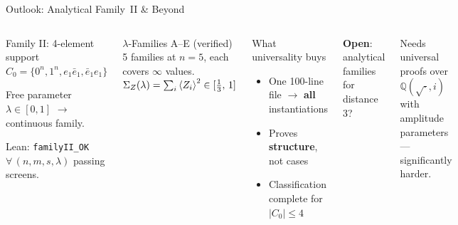 \documentclass[aspectratio=169,t]{beamer}
\newcommand{\QQ}{\mathbb{Q}}
\newcommand{\code}[1]{\texttt{\small #1}}
\begin{document}
\begin{frame}{Outlook: Analytical Family~II \& Beyond}

\vspace{-0.2em}
\begin{columns}[T]
\begin{block}{Family II: 4-element support}
$C_0 = \{0^n, 1^n, e_1 \bar{e}_1, \bar{e}_1 e_1 \}$

Free parameter $\lambda \in [0,1]$ $\to$ continuous family.

Lean: \code{familyII\_OK}\;
$\forall\,(n,m,s,\lambda)$ passing screens.
\end{block}

\begin{alertblock}{$\lambda$-Families A--E (verified)}
5 families at $n{=}5$, each covers $\infty$ values.\\
$\Sigma_Z(\lambda) = \sum_i \braket{Z_i}^2 \in [\tfrac{1}{3},\,1]$
\end{alertblock}

\begin{exampleblock}{What universality buys}
\begin{itemize}\setlength\itemsep{0pt}
\item One 100-line file $\to$ \textbf{all} instantiations
\item Proves \textbf{structure}, not cases
\item Classification complete for $|C_0| \leq 4$
\end{itemize}
\end{exampleblock}

\textbf{Open}: analytical families for \alert{distance 3}?

\textcolor{Slate}{\small Needs universal proofs over $\QQ(\sqrt{\cdot},i)$
with amplitude parameters --- significantly harder.}
\end{columns}
\end{frame}
\end{document}
